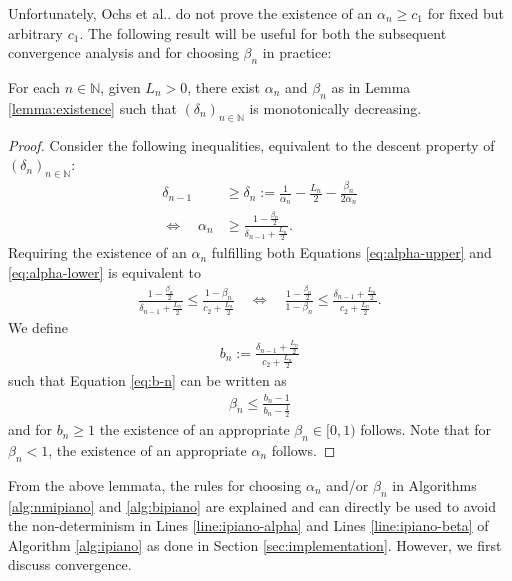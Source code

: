 \documentclass[onecolumn,final,a4paper,13pt,reqno]{siamart}
\makeatletter
\DeclareRobustCommand\onedot{\futurelet\@let@token\@onedot}
\def\@onedot{\ifx\@let@token.\else.\null\fi\xspace}
\def\etal{{et al}\onedot}
\makeatother
\begin{document}
Unfortunately, Ochs \etal do not prove the existence of an $\alpha_n \geq c_1$ for fixed but arbitrary $c_1$. The following result will be useful for both the subsequent convergence analysis and for choosing $\beta_n$ in practice:

\begin{lemmamd}
	For each $n \in \mathbb{N}$, given $L_n > 0$, there exist $\alpha_n$ and $\beta_n$ as in Lemma \ref{lemma:existence} such that $(\delta_n)_{n \in \mathbb{N}}$ is monotonically decreasing.\label{lemma:monotonicity}
\end{lemmamd}

\begin{proof}
	Consider the following inequalities, equivalent to the descent property of $(\delta_n)_{n \in \mathbb{N}}$:
	\begin{align}
		\delta_{n - 1} &\geq \delta_n := \frac{1}{\alpha_n} - \frac{L_n}{2} - \frac{\beta_n}{2\alpha_n}\\
		\Leftrightarrow\quad \alpha_n &\geq \frac{1 - \frac{\beta_n}{2}}{\delta_{n - 1} + \frac{L_n}{2}}.\label{eq:alpha-lower}
	\end{align}
	Requiring the existence of an $\alpha_n$ fulfilling both Equations \eqref{eq:alpha-upper} and \eqref{eq:alpha-lower} is equivalent to
	\begin{align}
		\frac{1 - \frac{\beta_n}{2}}{\delta_{n - 1} + \frac{L_n}{2}} \leq \frac{1 - \beta_n}{c_2 + \frac{L_n}{2}}\quad\Leftrightarrow\quad \frac{1 - \frac{\beta_n}{2}}{1 - \beta_n} \leq \frac{\delta_{n - 1} + \frac{L_n}{2}}{c_2 + \frac{L_n}{2}}.
	\end{align}
	We define
	\begin{align}
		b_n := \frac{\delta_{n - 1} + \frac{L_n}{2}}{c_2 + \frac{L_n}{2}}\label{eq:b-n}
	\end{align}
	such that Equation \eqref{eq:b-n} can be written as
	\begin{align}
		\beta_n \leq \frac{b_n - 1}{b_n - \frac{1}{2}}
	\end{align}
	and for $b_n \geq 1$ the existence of an appropriate $\beta_n \in [0,1)$ follows. Note that for $\beta_n < 1$, the existence of an appropriate $\alpha_n$ follows.
\end{proof}

From the above lemmata, the rules for choosing $\alpha_n$ and/or $\beta_n$ in Algorithms \ref{alg:nmipiano} and \ref{alg:bipiano} are explained and can directly be used to avoid the non-determinism in Lines \ref{line:ipiano-alpha} and Lines \ref{line:ipiano-beta} of Algorithm \ref{alg:ipiano} as done in Section \ref{sec:implementation}. However, we first discuss convergence.
\end{document}
